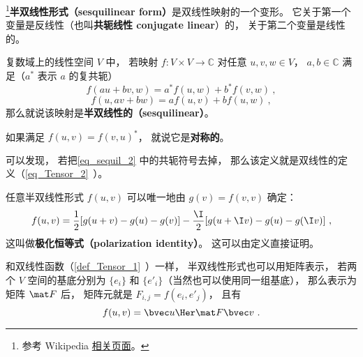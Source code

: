 
\begin{issues}
\issueDraft
\end{issues}

\footnote{参考 Wikipedia \href{https://en.wikipedia.org/wiki/Sesquilinear_form}{相关页面}。}\textbf{半双线性形式（sesquilinear form）}是双线性映射的一个变形。 它关于第一个变量是反线性（也叫\textbf{共轭线性 conjugate linear}）的， 关于第二个变量是线性的。
\begin{definition}{}\label{def_sequil_1}
复数域上的线性空间 $V$ 中， 若映射 $f:V\times V\to \mathbb C$ 对任意 $u, v, w\in V$， $a,b\in \mathbb C$ 满足（$a^*$ 表示 $a$ 的复共轭）
\begin{equation}\label{eq_sequil_2}
f(au+bv, w) = a^*f(u, w) + b^*f(v, w)~,
\end{equation}
\begin{equation}\label{eq_sequil_1}
f(u, av+bw) = af(u, v) + bf(u, w)~,
\end{equation}
那么就说该映射是\textbf{半双线性的（sesquilinear）}。
\end{definition}
如果满足 $f(u, v) = f(v, u)^*$， 就说它是\textbf{对称的}。

可以发现， 若把\autoref{eq_sequil_2} 中的共轭符号去掉， 那么该定义就是双线性的定义（\autoref{eq_Tensor_2}~）。

任意半双线性形式 $f(u, v)$ 可以唯一地由 $g(v) = f(v, v)$ 确定：
\begin{equation}
f(u, v) =\frac{1}{2}[g(u+v)-g(u)-g(v)]
-\frac{\I}{2}[g(u+\I v)-g(u)-g(\I v)]~,
\end{equation}
这叫做\textbf{极化恒等式（polarization identity）}。 这可以由定义直接证明。

和双线性函数（\autoref{def_Tensor_1}~）一样， 半双线性形式也可以用矩阵表示， 若两个 $V$ 空间的基底分别为 $\{e_i\}$ 和 $\{e'_i\}$（当然也可以使用同一组基底）， 那么表示为矩阵 $\mat F$ 后， 矩阵元就是 $F_{i,j} = f(e_i, e'_j)$， 且有
\begin{equation}
f(u, v) = \bvec u\Her \mat F \bvec v~.
\end{equation}

